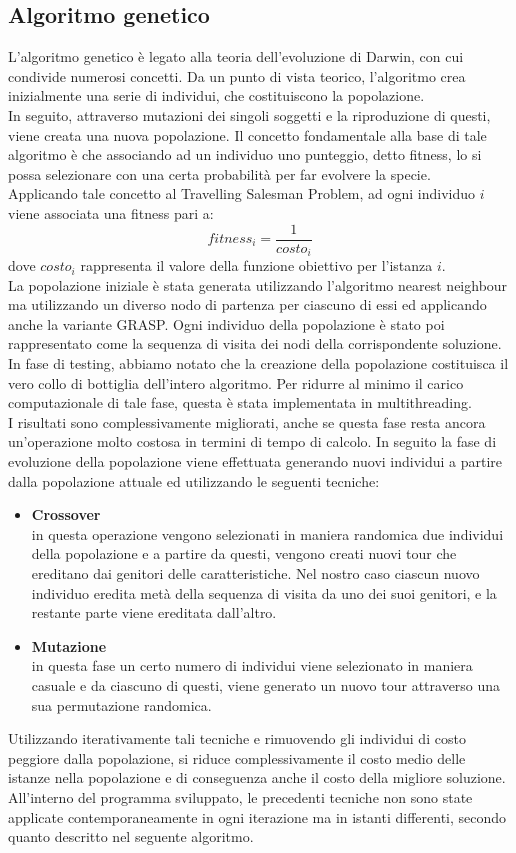 \subsection{Algoritmo genetico}
L'algoritmo genetico è legato alla teoria dell'evoluzione di Darwin, con cui condivide numerosi concetti. Da un punto di vista teorico, l'algoritmo crea inizialmente una serie di individui, che costituiscono la popolazione.\\
In seguito, attraverso mutazioni dei singoli soggetti e la riproduzione di questi, viene creata una nuova popolazione. Il concetto fondamentale alla base di tale algoritmo è che associando ad un individuo uno punteggio, detto fitness, lo si possa selezionare con una certa probabilità per far evolvere la specie.\\
Applicando tale concetto al Travelling Salesman Problem, ad ogni individuo $i$ viene associata una fitness pari a:
$$fitness_i=\frac{1}{costo_i}$$
dove $costo_i$ rappresenta il valore della funzione obiettivo per l'istanza $i$.\\
La popolazione iniziale è stata generata utilizzando l'algoritmo nearest neighbour ma utilizzando un diverso nodo di partenza per ciascuno di essi ed applicando anche la variante GRASP. Ogni individuo della popolazione è stato poi rappresentato come la sequenza di visita dei nodi della corrispondente soluzione.\\
In fase di testing, abbiamo notato che la creazione della popolazione costituisca il vero collo di bottiglia dell'intero algoritmo. Per ridurre al minimo il carico computazionale di tale fase, questa è stata implementata in multithreading.\\
I risultati sono complessivamente migliorati, anche se questa fase resta ancora un'operazione molto costosa in termini di tempo di calcolo.
In seguito la fase di evoluzione della popolazione viene effettuata generando nuovi individui a partire dalla popolazione attuale ed utilizzando le seguenti tecniche:
\begin{itemize}
\item{\textbf{Crossover}\\
in questa operazione vengono selezionati in maniera randomica due individui della popolazione e a partire da questi, vengono creati nuovi tour che ereditano dai genitori delle caratteristiche. Nel nostro caso ciascun nuovo individuo eredita metà della sequenza di visita da uno dei suoi genitori, e la restante parte viene ereditata dall'altro.}
\item{\textbf{Mutazione}\\
in questa fase un certo numero di individui viene selezionato in maniera casuale e da ciascuno di questi, viene generato un nuovo tour attraverso una sua permutazione randomica.}
\end{itemize}
Utilizzando iterativamente tali tecniche e rimuovendo gli individui di costo peggiore dalla popolazione, si riduce complessivamente il costo medio delle istanze nella popolazione e di conseguenza anche il costo della migliore soluzione. All'interno del programma sviluppato, le precedenti tecniche non sono state applicate contemporaneamente in ogni iterazione ma in istanti differenti, secondo quanto descritto nel seguente algoritmo.\\

